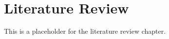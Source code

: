 \chapter{Literature Review} \label{chap:sota}
This is a placeholder for the literature review chapter.

